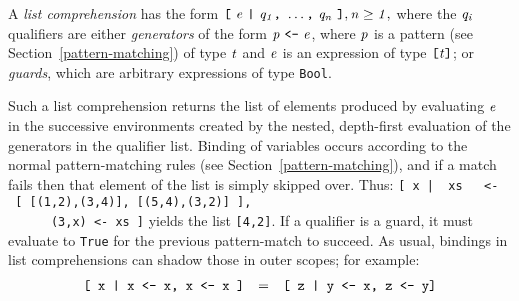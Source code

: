 \noindent
A {\em list comprehension} has the form \mbox{$\it \makebox{\tt [}\ e\ \makebox{\tt |}\ q_1\makebox{\tt ,}\ \ldots \makebox{\tt ,}\ q_n\ \makebox{\tt ]},\\
\it n\geq 1,$} where the \mbox{$\it q_i$} qualifiers are either {\em
generators} of the form \mbox{$\it p\ \makebox{\tt <-}\ e$}, where \mbox{$\it p$} is a
pattern (see Section~\ref{pattern-matching}) of type \mbox{$\it t$} and \mbox{$\it e$} is an
expression of type \mbox{$\it \makebox{\tt [}t\makebox{\tt ]}$}; or {\em guards}, which are
arbitrary expressions of type \mbox{\tt Bool}.

Such a list comprehension returns the list of elements
produced by evaluating \mbox{$\it e$} in the successive environments
created by the nested, depth-first evaluation of the generators in the
qualifier list.  Binding of variables occurs according to the normal
pattern-matching rules (see Section~\ref{pattern-matching}), and if a
match fails then that element of the list is simply skipped over.  Thus:\nopagebreak[4]
\bprog
\mbox{\tt [\ x\ |\ \ xs\ \ \ <-\ [\ [(1,2),(3,4)],\ [(5,4),(3,2)]\ ],\ }\\
\mbox{\tt \ \ \ \ \ \ (3,x)\ <-\ xs\ ]}
\eprog
yields the list \mbox{\tt [4,2]}.  If a qualifier is a guard, it must evaluate
to \mbox{\tt True} for the previous pattern-match to succeed.  
As usual, bindings in list comprehensions can shadow those in outer
scopes; for example:
\[\ba{lll}
\mbox{\tt [\ x\ |\ x\ <-\ x,\ x\ <-\ x\ ]} & = & \mbox{\tt [\ z\ |\ y\ <-\ x,\ z\ <-\ y]} \\
\ea\]
